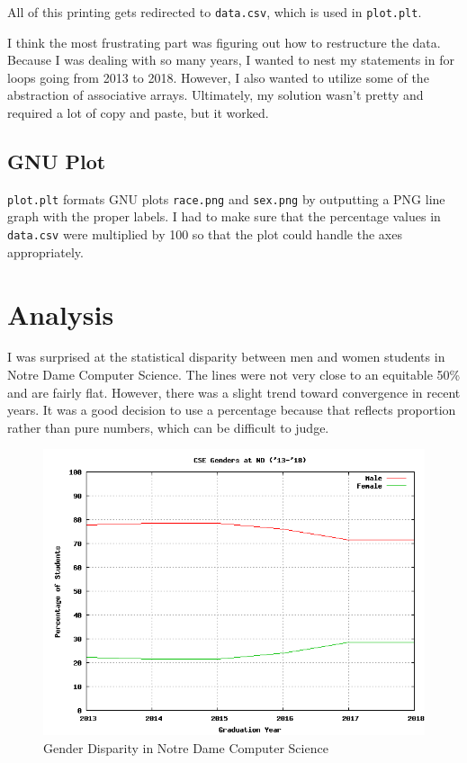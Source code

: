\documentclass[letterpaper]{article}
\begin{document}
All of this printing gets redirected to {\tt data.csv}, which is used in {\tt plot.plt}.

I think the most frustrating part was figuring out how to restructure the data. Because I was dealing with so many years, I wanted to nest my statements in for loops going from 2013 to 2018. However, I also wanted to utilize some of the abstraction of associative arrays. Ultimately, my solution wasn't pretty and required a lot of copy and paste, but it worked.

\subsection*{GNU Plot}

{\tt plot.plt} formats GNU plots {\tt race.png} and {\tt sex.png} by outputting a PNG line graph with the proper labels. I had to make sure that the percentage values in {\tt data.csv} were multiplied by 100 so that the plot could handle the axes appropriately.

 
\section*{Analysis}

I was surprised at the statistical disparity between men and women students in Notre Dame Computer Science. The lines were not very close to an equitable 50\% and are fairly flat. However, there was a slight trend toward convergence in recent years. It was a good decision to use a percentage because that reflects proportion rather than pure numbers, which can be difficult to judge.

\begin{figure}[!htb]
\centering
\includegraphics[width=5in]{sex.png}
\caption{Gender Disparity in Notre Dame Computer Science}
\label{fig:gender}
\end{figure}
\end{document}
